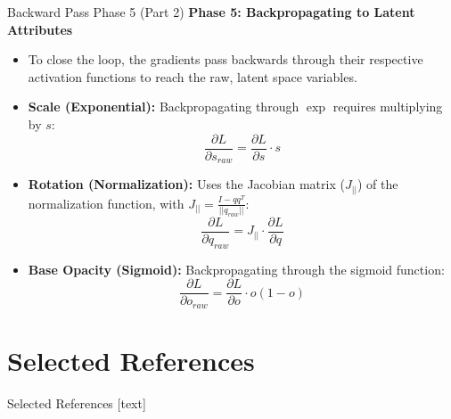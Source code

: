 \begin{frame}{Backward Pass Phase 5 (Part 2)}
    \textbf{Phase 5: Backpropagating to Latent Attributes}
    \begin{itemize}
        \item To close the loop, the gradients pass backwards through their respective activation functions to reach the raw, latent space variables.
        \item \textbf{Scale (Exponential):} Backpropagating through $\exp$ requires multiplying by $s$:
        $$ \frac{\partial L}{\partial s_{raw}} = \frac{\partial L}{\partial s} \cdot s $$
        \item \textbf{Rotation (Normalization):} Uses the Jacobian matrix ($J_{||}$) of the normalization function, with $J_{||} = \frac{I - qq^T}{||q_{raw}||}$:
        $$ \frac{\partial L}{\partial q_{raw}} = J_{||} \cdot \frac{\partial L}{\partial q} $$
        \item \textbf{Base Opacity (Sigmoid):} Backpropagating through the sigmoid function:
        $$ \frac{\partial L}{\partial o_{raw}} = \frac{\partial L}{\partial o} \cdot o(1-o) $$
    \end{itemize}
\end{frame}

\section{Selected References}

\begin{frame}[allowframebreaks]{Selected References}
    \footnotesize
    \nocite{*}
    [text]
    
    
    
\end{frame}